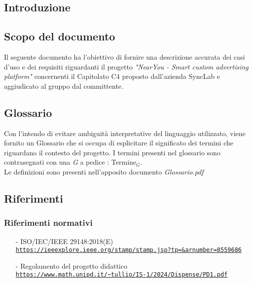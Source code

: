 \documentclass[11pt]{article}
\begin{document}
\newpage
\begin{justify}
    

\section{Introduzione}
\label{sec:intro}

\subsection{Scopo del documento}

Il seguente documento ha l'obiettivo di fornire una descrizione accurata dei casi d'uso e dei requisiti riguardanti il progetto \textit{"NearYou - 
Smart custom advertising platform"} concernenti il Capitolato C4 proposto dall'azienda SyncLab e aggiudicato al gruppo dal committente.


\subsection{Glossario}
Con l'intendo di evitare ambiguità interpretative del linguaggio utilizzato, viene fornito un Glossario che si occupa di esplicitare il significato dei termini che riguardano il contesto del progetto. I termini presenti nel glossario sono contrasegnati con una \textit{G} a pedice : Termine$_G$.\\
Le definizioni sono presenti nell'apposito documento \textit{Glossario.pdf}


\subsection{Riferimenti}


\subsubsection{Riferimenti normativi}
\begin{itemize}
    \item[-] ISO/IEC/IEEE 29148:2018(E) \\
    \textcolor{blue}{\texttt{\url{https://ieeexplore.ieee.org/stamp/stamp.jsp?tp=&arnumber=8559686}}}
    
    \item[-] Regolamento del progetto didattico  \\
    \textcolor{blue}{\texttt{\url{https://www.math.unipd.it/~tullio/IS-1/2024/Dispense/PD1.pdf}}}
    
\end{itemize}

\end{justify}
\end{document}
